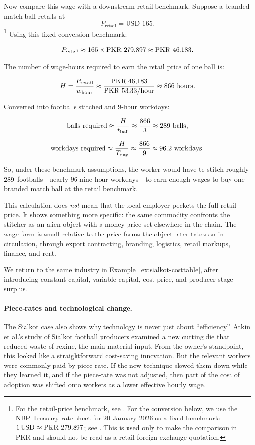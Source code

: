 \begin{example}
Now compare this wage with a downstream retail benchmark. Suppose a branded match ball retails at
\[
P_{\text{retail}}=\text{USD }165.
\]
\footnote{For the retail-price benchmark, see \cite{GoalAlRihla2022}. For the conversion below, we use the NBP Treasury rate sheet for 20 January 2026 as a fixed benchmark: \(1\,\text{USD}\approx\text{PKR }279.897{}\); see \cite{NBPRateSheet20Jan2026}. This is used only to make the comparison in PKR and should not be read as a retail foreign-exchange quotation.}
Using this fixed conversion benchmark:

\[
P_{\text{retail}}
\approx
165\times \text{PKR }279.897{}
\approx
\text{PKR }46{,}183{}.
\]

The number of wage-hours required to earn the retail price of one ball is:

\[
H
=
\frac{P_{\text{retail}}}{w_{\text{hour}}}
\approx
\frac{\text{PKR }46{,}183{}}{\text{PKR }53.33{}/\text{hour}}
\approx
866{}\ \text{hours}.
\]

Converted into footballs stitched and 9-hour workdays:

\[
\text{balls required}
\approx
\frac{H}{t_{\text{ball}}}
\approx
\frac{866}{3}
\approx
289{}\ \text{balls},
\]

\[
\text{workdays required}
\approx
\frac{H}{T_{\text{day}}}
\approx
\frac{866}{9}
\approx
96.2{}\ \text{workdays}.
\]

So, under these benchmark assumptions, the worker would have to stitch roughly
\(289{}\) footballs---nearly \(96\) nine-hour workdays---to earn enough
wages to buy one branded match ball at the retail benchmark.

This calculation does \emph{not} mean that the local employer pockets the full
retail price. It shows something more specific: the same commodity confronts the
stitcher as an alien object with a money-price set elsewhere in the chain. The
wage-form is small relative to the price-forms the object later takes on in
circulation, through export contracting, branding, logistics, retail markups,
finance, and rent.

We return to the same industry in Example~\ref{ex:sialkot-costtable}, after
introducing constant capital, variable capital, cost price, and producer-stage
surplus.

\end{example}

\paragraph{Piece-rates and technological change.}
The Sialkot case also shows why technology is never just about ``efficiency''.
Atkin et al.'s study of Sialkot football producers examined a new
cutting die that reduced waste of rexine, the main material input. From the
owner's standpoint, this looked like a straightforward cost-saving innovation.
But the relevant workers were commonly paid by piece-rate. If the new technique
slowed them down while they learned it, and if the piece-rate was not adjusted,
then part of the cost of adoption was shifted onto workers as a lower effective
hourly wage.\cite{AtkinEtAl2017}


